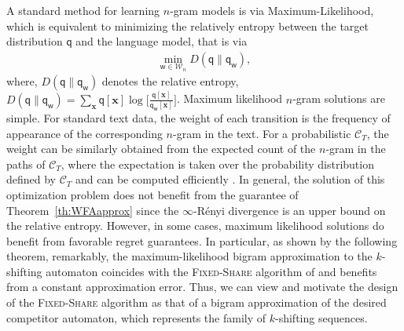 \documentclass{article}
\newcommand{\sC}{\mathscr C}
\newcommand{\bx}{{\mathbf x}}
\newcommand{\sfq}{{\mathsf q}}
\newcommand{\sfw}{{\mathsf w}}
\newcommand{\cW}{\mathcal W}
\newcommand{\ignore}[1]{}
\begin{document}
A standard method for learning $n$-gram models is via
Maximum-Likelihood, which is equivalent to minimizing the
relatively entropy between the target distribution $\sfq$ and the
language model, that is via
\begin{align}
  \label{eq:mlngram}
\min_{\sfw \in \cW_n} D(\sfq \| \sfq_{\sfw}),
\end{align}
where, $D(\sfq \| \sfq_{\sfw})$ denotes the relative entropy,
$D(\sfq \| \sfq_{\sfw}) = \sum_\bx \sfq[\bx]
\log\Big[\frac{\sfq[\bx]}{\sfq_\sfw[\bx]} \Big]$.  Maximum likelihood
$n$-gram solutions are simple. For standard text data, the weight of each
transition is the frequency of appearance of the corresponding
$n$-gram in the text. For a probabilistic $\sC_T$, the weight can be
similarly obtained from the expected count of the $n$-gram in the
paths of $\sC_T$, where the expectation is taken over the probability
distribution defined by $\sC_T$ and can be computed efficiently
\citep{AllauzenMohriRoark2003}. In general, the solution of this
optimization problem does not benefit from the guarantee of
Theorem~\ref{th:WFAapprox} since the $\infty$-R\'{e}nyi divergence is
an upper bound on the relative entropy.\ignore{\footnote{The relative entropy
  also coincides with the R\'{e}nyi divergence of order $1$ and the
  R\'{e}nyi divergence is non-decreasing function of the order.}}
However, in some cases, maximum likelihood solutions do benefit from
favorable regret guarantees.  In particular, as shown by the following
theorem, remarkably, the maximum-likelihood bigram approximation to
the $k$-shifting automaton coincides with the \textsc{Fixed-Share}
algorithm of \cite{HerbsterWarmuth1998} and benefits from a constant
approximation error. Thus, we can view and motivate the design of the
\textsc{Fixed-Share} algorithm as that of a bigram approximation of
the desired competitor automaton, which represents the family of
$k$-shifting sequences.
\end{document}
